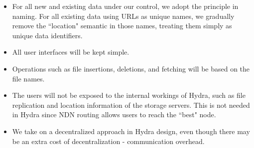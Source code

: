 \begin{itemize}

\item For all new and existing data under our control, we adopt the principle in naming. For all existing data using URLs as unique names, we gradually remove the ``location" semantic in those names, treating them simply as unique data identifiers.
\item All user interfaces will be kept simple. 
\item Operations such as file insertions, deletions, and fetching will be based on the file names.
\item The users will not be exposed to the internal workings of Hydra, such as file replication and location information of the storage servers. 
This is not needed in Hydra since NDN routing allows users to reach the ``best" node. 

\item We take on a decentralized approach in Hydra design, even though there may be an extra cost of decentralization - communication overhead.

\end{itemize}